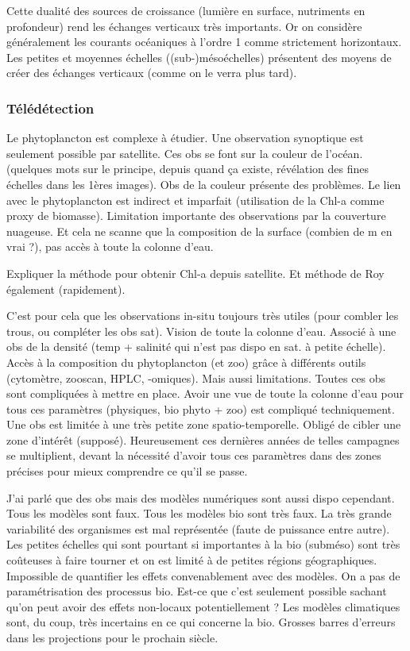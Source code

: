 Cette dualité des sources de croissance (lumière en surface, nutriments en profondeur) rend les échanges verticaux très importants.
Or on considère généralement les courants océaniques à l'ordre 1 comme strictement horizontaux.
Les petites et moyennes échelles ((sub-)mésoéchelles) présentent des moyens de créer des échanges verticaux (comme on le verra plus tard).

\subsubsection{Télédétection}
\label{sec:teledetection}

Le phytoplancton est complexe à étudier.
Une observation synoptique est seulement possible par satellite.
Ces obs se font sur la couleur de l'océan. (quelques mots sur le principe, depuis quand ça existe, révélation des fines échelles dans les 1ères images).
Obs de la couleur présente des problèmes. Le lien avec le phytoplancton est indirect et imparfait (utilisation de la Chl-a comme proxy de biomasse). Limitation importante des observations par la couverture nuageuse. Et cela ne scanne que la composition de la surface (combien de m en vrai ?), pas accès à toute la colonne d'eau.

Expliquer la méthode pour obtenir Chl-a depuis satellite. Et méthode de Roy également (rapidement).

C'est pour cela que les observations in-situ toujours très utiles (pour combler les trous, ou compléter les obs sat). Vision de toute la colonne d'eau. Associé à une obs de la densité (temp + salinité qui n'est pas dispo en sat. à petite échelle).
Accès à la composition du phytoplancton (et zoo) grâce à différents outils (cytomètre, zooscan, HPLC, -omiques).
Mais aussi limitations. Toutes ces obs sont compliquées à mettre en place. Avoir une vue de toute la colonne d'eau pour tous ces paramètres (physiques, bio phyto + zoo) est compliqué techniquement. Une obs est limitée à une très petite zone spatio-temporelle. Obligé de cibler une zone d'intérêt (supposé).
Heureusement ces dernières années de telles campagnes se multiplient, devant la nécessité d'avoir tous ces paramètres dans des zones précises pour mieux comprendre ce qu'il se passe.

J'ai parlé que des obs mais des modèles numériques sont aussi dispo cependant.
Tous les modèles sont faux. Tous les modèles bio sont très faux.
La très grande variabilité des organismes est mal représentée (faute de puissance entre autre). Les petites échelles qui sont pourtant si importantes à la bio (subméso) sont très coûteuses à faire tourner et on est limité à de petites régions géographiques. Impossible de quantifier les effets convenablement avec des modèles.
On a pas de paramétrisation des processus bio. Est-ce que c'est seulement possible sachant qu'on peut avoir des effets non-locaux potentiellement ?
Les modèles climatiques sont, du coup, très incertains en ce qui concerne la bio.
Grosses barres d'erreurs dans les projections pour le prochain siècle.


